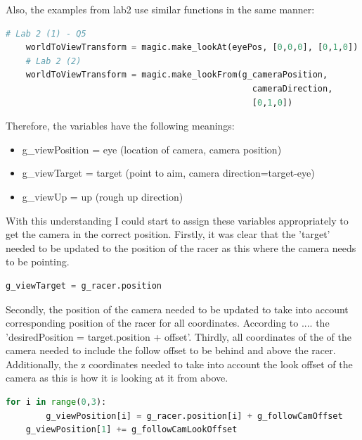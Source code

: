 \documentclass[a4 paper, 12pt]{article}
\begin{document}
Also, the examples from lab2 use similar functions in the same manner:
    \begin{lstlisting}[language=python]
    # Lab 2 (1) - Q5
    worldToViewTransform = magic.make_lookAt(eyePos, [0,0,0], [0,1,0])
    # Lab 2 (2) 
    worldToViewTransform = magic.make_lookFrom(g_cameraPosition,   
                                                 cameraDirection, 
                                                 [0,1,0])
    \end{lstlisting}
    
Therefore, the variables have the following meanings:
    \begin{itemize}
        \item g\_viewPosition = eye (location of camera, camera position)
        \item g\_viewTarget = target (point to aim, camera direction=target-eye)
        \item g\_viewUp = up (rough up direction)
    \end{itemize}    
    
With this understanding I could start to assign these variables appropriately to get the camera in the correct position. Firstly, it was clear that the 'target' needed to be updated to the position of the racer as this where the camera needs to be pointing. 
    \begin{lstlisting}[language=python]
    g_viewTarget = g_racer.position
    \end{lstlisting}

Secondly, the position of the camera needed to be updated to take into account corresponding position of the racer for all coordinates. According to .... the 'desiredPosition = target.position + offset'. Thirdly, all coordinates of the of the camera needed to include the follow offset to be behind and above the racer. Additionally, the z coordinates needed to take into account the look offset of the camera as this is how it is looking at it from above.
    \begin{lstlisting}[language=python]
    for i in range(0,3):
        g_viewPosition[i] = g_racer.position[i] + g_followCamOffset
    g_viewPosition[1] += g_followCamLookOffset
    \end{lstlisting}
\end{document}
